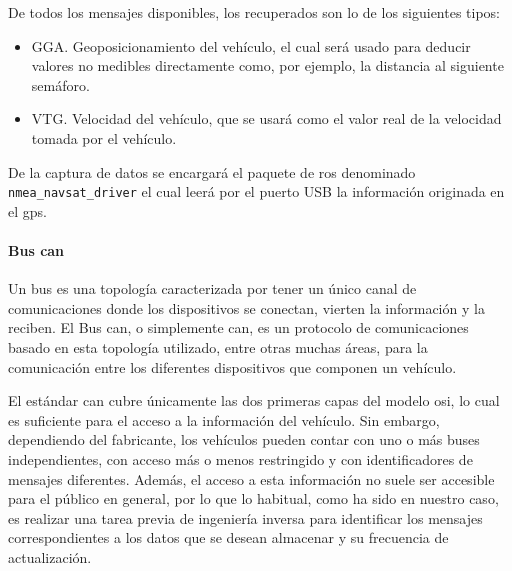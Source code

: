 De todos los mensajes disponibles, los recuperados son lo de los siguientes tipos:

\begin{itemize}
	\item GGA. Geoposicionamiento del vehículo, el cual será usado para deducir valores no medibles directamente como, por ejemplo, la distancia al siguiente semáforo.
	\item VTG. Velocidad del vehículo, que se usará como el valor real de la velocidad tomada por el vehículo.
\end{itemize}

De la captura de datos se encargará el paquete de \ac{ros} denominado \texttt{nmea\_navsat\_driver}  el cual leerá por el puerto USB la información originada en el \ac{gps}.

\paragraph{Bus \Acrshort{can}}

Un bus es una topología caracterizada por tener un único canal de comunicaciones donde los dispositivos se conectan, vierten la información y la reciben. El Bus \Acrshort{can}, o simplemente \Acrshort{can}, es un protocolo de comunicaciones basado en esta topología utilizado, entre otras muchas áreas, para la comunicación entre los diferentes dispositivos que componen un vehículo.

El estándar \ac{can} cubre únicamente las dos primeras capas del modelo \ac{osi}, lo cual es suficiente para el acceso a la información del vehículo. Sin embargo, dependiendo del fabricante, los vehículos pueden contar con uno o más buses independientes, con acceso más o menos restringido y con identificadores de mensajes diferentes. Además, el acceso a esta información no suele ser accesible para el público en general, por lo que lo habitual, como ha sido en nuestro caso, es realizar una tarea previa de ingeniería inversa para identificar los mensajes correspondientes a los datos que se desean almacenar y su frecuencia de actualización.

